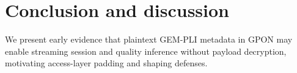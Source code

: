 \documentclass[conference]{IEEEtran}
\begin{document}
%






\fi
\section{Conclusion and discussion}
We present early evidence that plaintext GEM-PLI metadata in GPON may enable streaming session and quality inference without payload decryption, motivating access-layer padding and shaping defenses.






\end{document}
